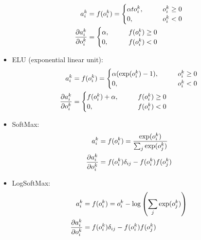 \documentclass[12pt,notitlepage]{article}
\begin{document}
\begin{itemize}
\begin{align}
    \label{eq:plu-fun}
    a_{i}^{k} &= f(o_{i}^{k}) =
                \begin{cases}
                  \alpha to_{i}^{k}, \qquad & o_{i}^{k} \ge 0\\
                  0, \qquad & o_{i}^{k} < 0
                \end{cases}\\
    \frac{\partial a_{i}^{k}}{\partial o_{i}^{k}} &=
                                    \begin{cases}
                                      \alpha, \qquad & f(o_{i}^{k}) \ge 0\\
                                      0, \qquad & f(o_{i}^{k}) < 0
                                    \end{cases}
  \end{align}
\item ELU (exponential linear unit):
  \begin{align}
    \label{eq:elu-fun}
    a_{i}^{k} &= f(o_{i}^{k}) =
                \begin{cases}
                  \alpha ( \exp(o_{i}^{k}) - 1 ), \qquad & o_{i}^{k} \ge 0\\
                  0, \qquad & o_{i}^{k} < 0
                \end{cases}\\
    \frac{\partial a_{i}^{k}}{\partial o_{i}^{k}} &=
                                    \begin{cases}
                                      f(o_{i}^{k}) + \alpha, \qquad & f(o_{i}^{k}) \ge 0\\
                                      0, \qquad & f(o_{i}^{k}) < 0
                                    \end{cases}
  \end{align}
\item SoftMax:
  \begin{align}
    \label{eq:relu-fun}
    a_{i}^{k} &= f(o_{i}^{k}) = \frac{\exp(o_{i}^{k})}{\sum_{j}\exp(o_{j}^{k})}\\
    \frac{\partial a_{i}^{k}}{\partial o_{i}^{k}} &= f(o_{i}^{k})\delta_{ij} - f(o_{i}^{k})f(o_{j}^{k})
  \end{align}
\item LogSoftMax:
  \begin{align}
    \label{eq:relu-fun}
    a_{i}^{k} &= f(o_{i}^{k}) = o_{i}^{k} - \log\left(
                \sum_{j}\exp(o_{j}^{k}) \right)\\
    \frac{\partial a_{i}^{k}}{\partial o_{i}^{k}} &= f(o_{i}^{k})\delta_{ij} - f(o_{i}^{k})f(o_{j}^{k})
  \end{align}
\end{itemize}
\end{document}
